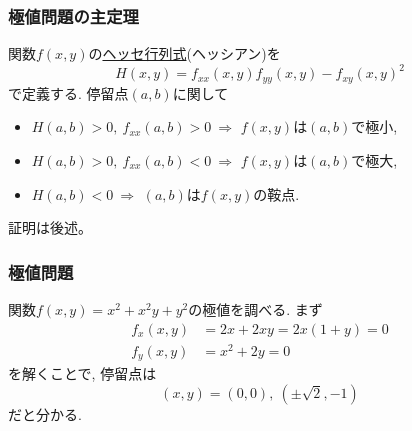 

\begin{frame}
\frametitle{極値問題の主定理}


\begin{Thm} \label{停留点とヘッセ行列}
関数$f(x,y)$の\underline{ヘッセ行列式}(ヘッシアン)を
$$
H(x,y)
=f_{xx}(x,y)f_{yy}(x,y)-f_{xy}(x,y)^2
$$
で定義する. 
停留点$(a,b)$に関して 
\begin{itemize}
\item $H(a,b)>0, \ f_{xx}(a,b)>0 \ \Longrightarrow$ $f(x,y)$は$(a,b)$で極小, 
\item $H(a,b)>0, \ f_{xx}(a,b)<0 \ \Longrightarrow$ $f(x,y)$は$(a,b)$で極大, 
\item $H(a,b)<0 \ \Longrightarrow$ $(a,b)$は$f(x,y)$の鞍点. 
\end{itemize}
\end{Thm}

証明は後述。
\end{frame}





\begin{frame}
\frametitle{極値問題}

関数$f(x,y)=x^2+x^2y+y^2$の極値を調べる. まず
\begin{align*}
f_x(x,y) &= 2x+2xy=2x(1+y)=0\\ 
f_y(x,y) &= x^2+2y=0
\end{align*}
を解くことで, 停留点は
$$
(x,y)=(0,0), \ (\pm \sqrt{2},-1)
$$
だと分かる. 

\end{frame}




